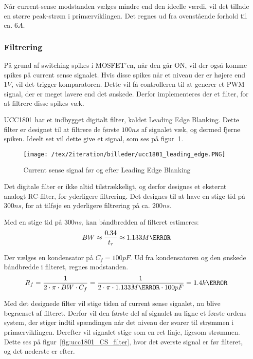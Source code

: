Når current-sense modstanden vælges mindre end den ideelle værdi, vil det tillade en større peak-strøm i primærviklingen. Det regnes ud fra ovenstående forhold til ca. $6A$. 



\subsubsection{Filtrering}
På grund af switching-spikes i MOSFET'en, når den går ON, vil der også komme spikes på current sense signalet. Hvis disse spikes når et niveau der er højere end $1V$, vil det trigger komparatoren. Dette vil få controlleren til at generer et PWM-signal, der er meget lavere end det ønskede. Derfor implementeres der et filter, for at filtrere disse spikes væk.

UCC1801 har et indbygget digitalt filter, kaldet Leading Edge Blanking. Dette filter er designet til at filtrere de første $100ns$ af signalet væk, og dermed fjerne spiken. Ideelt set vil dette give et signal, som ses på figur~\ref{fig:ucc1801_leading_edge}.

\begin{figure}[H]
	\center
	\texttt{[image: /tex/2iteration/billeder/ucc1801\_leading\_edge.PNG]}
	\caption{Current sense signal før og efter Leading Edge Blanking}
	\label{fig:ucc1801_leading_edge}
\end{figure}

Det digitale filter er ikke altid tilstrækkeligt, og derfor designes et eksternt analogt RC-filter, for yderligere filtrering. Det designes til at have en stige tid på $300ns$, for at tilføje en yderligere filtrering på ca. $200ns$. 

\noindent Med en stige tid på $300ns$, kan båndbredden af filteret estimeres:
\begin{equation} \label{filter_BW}
BW \approx \frac{0.34}{t_r} \approx 1.133M\hertz
\end{equation}

\noindent Der vælges en kondensator på $C_f=100pF$. Ud fra kondensatoren og den ønskede båndbredde i filteret, regnes modstanden.
\begin{equation} \label{filter_R}
R_f = \frac{1}{2 \cdot \pi \cdot BW \cdot C_f} = \frac{1}{2 \cdot \pi \cdot 1.133M\hertz \cdot 100pF} = 1.4k\ohm
\end{equation}

Med det designede filter vil stige tiden af current sense signalet, nu blive begrænset af filteret. Derfor vil den første del af signalet nu ligne et første ordens system, der stiger indtil spændingen når det niveau der svarer til strømmen i primærviklingen. Derefter vil signalet stige som en ret linje, ligesom strømmen. Dette ses på figur~\ref{fig:ucc1801_CS_filter}, hvor det øverste signal er før filteret, og det nederste er efter.

